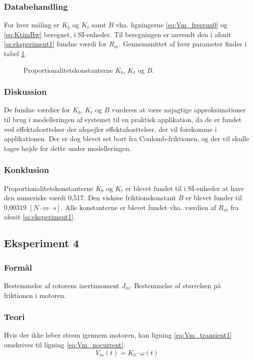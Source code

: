 \subsubsection{Databehandling}
For hver måling er \(K_b\) og \(K_t\) samt \(B\) vha. ligningerne \ref{eq:Vm_freerun0} og \ref{eq:KtimBw} beregnet,
i SI-enheder. Til beregningen er anvendt den i afsnit \ref{ss:eksperiment1} fundne værdi for \(R_m\).
Gennemsnittet af hver parameter findes i tabel \ref{tb:kbktb}.
\begin{figure}[th!]
	\centering
	
	\captionsetup{type=table}
	\caption[Proportionalitetskonstanterne \(K_b\), \(K_t\) og \(B\)]
			{Proportionalitetskonstanterne \(K_b\), \(K_t\) og \(B\).}
	\label{tb:kbktb}
\end{figure}

\subsubsection{Diskussion}
De fundne værdier for \(K_b\), \(K_t\) og \(B\) vurderes at være nøjagtige approksimationer
til brug i modelleringen af systemet til en praktisk applikation, da de er fundet ved effektafsættelser
der afspejler effektafsættelser, der vil forekomme i applikationen.
Der er dog blevet set bort fra Coulomb-friktionen, og der vil skulle tages højde for dette under modelleringen.
\subsubsection{Konklusion}
Proportionalitetskonstanterne \(K_b\) og \(K_t\) er blevet fundet til i SI-enheder at have den numeriske værdi 0,517.
Den viskøse friktionskonstant \(B\) er blevet funder til 0,00319 \([N \cdot m \cdot s]\).
Alle konstanterne er blevet fundet vha. værdien af \(R_m\) fra afsnit \ref{ss:eksperiment1}.
\subsection{Eksperiment 4}
\subsubsection{Formål}
Bestemmelse af rotorens inertimoment \(J_m\).
Bestemmelse af størrelsen på friktionen i motoren.
\subsubsection{Teori}
Hvis der ikke løber strøm igennem motoren,
kan ligning \ref{eq:Vm_transient1} omskrives til ligning \ref{eq:Vm_nocurrent}.
\begin{equation}
	V_m(t)=K_b\cdot\omega(t)
	\label{eq:Vm_nocurrent}
 \end{equation}


